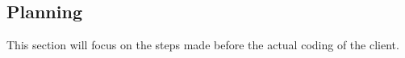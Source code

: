 \subsection{Planning}
This section will focus on the steps made before the actual coding of the client.




\newpage